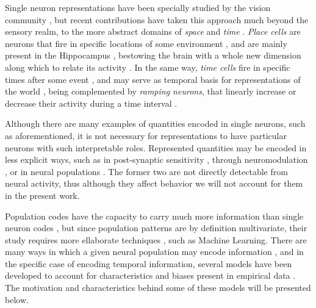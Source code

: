    Single neuron representations have been specially studied by the vision community \cite{deyoe1988concurrent,bell1997independent,ito2004representation,lee2008sparse}, but recent contributions have taken this approach much beyond the sensory realm, to the more abstract domains of \textit{space} and \textit{time} \cite{eichenbaum2014time}. \textit{Place cells} are neurons that fire in specific locations of some environment \cite{foster2006reverse}, and are mainly present in the Hippocampus \cite{o1979review}, bestowing the brain with a whole new dimension along which to relate its activity \cite{eichenbaum2014time}. In the same way, \textit{time cells} fire in specific times after some event \cite{tiganj2016sequential, eichenbaum2014time}, and may serve as temporal basis for representations of the world \cite{ludvig2008stimulus}, being complemented by \textit{ramping neurons}, that linearly increase or decrease their activity during a time interval \cite{morrison2009convergence, kim2013neural, tiganj2016sequential, parker2016timing}.
    
    Although there are many examples of quantities encoded in single neurons, such as aforementioned, it is not necessary for representations to have particular neurons with such interpretable roles. Represented quantities may be encoded in less explicit ways, such as in post-synaptic sensitivity \cite{motanis2018short}, through neuromodulation \cite{friston2009free, friston2010free}, or in neural populations \cite{shamir2014emerging, quiroga2009extracting}. The former two are not directly detectable from neural activity, thus although they affect behavior \cite{wolff2017dynamic} we will not account for them in the present work.
    
    Population codes have the capacity to carry much more information than single neuron codes \cite{hardy2016neurocomputational}, but since population patterns are by definition multivariate, their study requires more ellaborate techniques \cite{quiroga2009extracting}, such as Machine Learning. There are many ways in which a given neural population may encode information \cite{quiroga2009extracting, shamir2014emerging, mello2015scalable}, and in the specific case of encoding temporal information, several models have been developed to account for characteristics and biases present in empirical data \cite{hardy2016neurocomputational}. The motivation and characteristics behind some of these models will be presented below.
    

